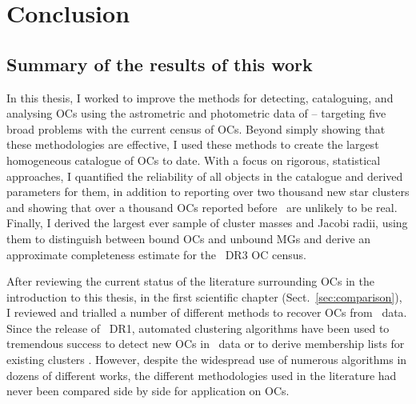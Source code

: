 %
\chapter{Conclusion}
\label{sec:conclusion}



\section{Summary of the results of this work}

In this thesis, I worked to improve the methods for detecting, cataloguing, and analysing OCs using the astrometric and photometric data of \gaia -- targeting five broad problems with the current census of OCs. Beyond simply showing that these methodologies are effective, I used these methods to create the largest homogeneous catalogue of OCs to date. With a focus on rigorous, statistical approaches, I quantified the reliability of all objects in the catalogue and derived parameters for them, in addition to reporting over two thousand new star clusters and showing that over a thousand OCs reported before \gaia\ are unlikely to be real. Finally, I derived the largest ever sample of cluster masses and Jacobi radii, using them to distinguish between bound OCs and unbound MGs and derive an approximate completeness estimate for the \gaia\ DR3 OC census.

After reviewing the current status of the literature surrounding OCs in the introduction to this thesis, in the first scientific chapter (Sect.~\ref{sec:comparison}), I reviewed and trialled a number of different methods to recover OCs from \gaia\ data. Since the release of \gaia\ DR1, automated clustering algorithms have been used to tremendous success to detect new OCs in \gaia\ data or to derive membership lists for existing clusters \citep[e.g.][]{castro-ginard_new_2018,castro-ginard_hunting_2019,castro-ginard_hunting_2020,castro-ginard_hunting_2022,liu_catalog_2019,cantat-gaudin_characterising_2018,cantat-gaudin_clusters_2020,cantat-gaudin_gaia_2019,he_catalogue_2021,he_new_2022,hao_sixteen_2020,jaehnig_membership_2021}. However, despite the widespread use of numerous algorithms in dozens of different works, the different methodologies used in the literature had never been compared side by side for application on OCs.

